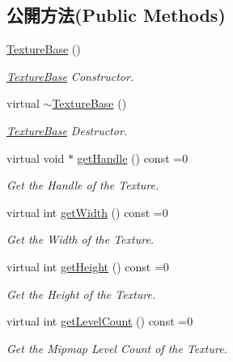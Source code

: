 \subsection*{公開方法(Public Methods)}
\begin{DoxyCompactItemize}
\item 
\hyperlink{class_magnum_1_1_texture_base_a4122f02aa0446f2f3e33d8593e0af3e7}{Texture\+Base} ()
\begin{DoxyCompactList}\small\item\em \hyperlink{class_magnum_1_1_texture_base}{Texture\+Base} Constructor. \end{DoxyCompactList}\item 
virtual \hyperlink{class_magnum_1_1_texture_base_a02e6c749103f29c0ae38a33d15932eac}{$\sim$\+Texture\+Base} ()
\begin{DoxyCompactList}\small\item\em \hyperlink{class_magnum_1_1_texture_base}{Texture\+Base} Destructor. \end{DoxyCompactList}\item 
virtual void $\ast$ \hyperlink{class_magnum_1_1_texture_base_a47ee419784cb12ca283f62deb2499b1e}{get\+Handle} () const  =0
\begin{DoxyCompactList}\small\item\em Get the Handle of the Texture. \end{DoxyCompactList}\item 
virtual int \hyperlink{class_magnum_1_1_texture_base_a51ea88554cb238b08ff6f79c5605a53b}{get\+Width} () const  =0
\begin{DoxyCompactList}\small\item\em Get the Width of the Texture. \end{DoxyCompactList}\item 
virtual int \hyperlink{class_magnum_1_1_texture_base_a1a75ad18ee40238b2d6fb2105c5ce786}{get\+Height} () const  =0
\begin{DoxyCompactList}\small\item\em Get the Height of the Texture. \end{DoxyCompactList}\item 
virtual int \hyperlink{class_magnum_1_1_texture_base_af21b138bcc2a202a45551edbc9581022}{get\+Level\+Count} () const  =0
\begin{DoxyCompactList}\small\item\em Get the Mipmap Level Count of the Texture. \end{DoxyCompactList}\item 

\end{DoxyCompactItemize}
